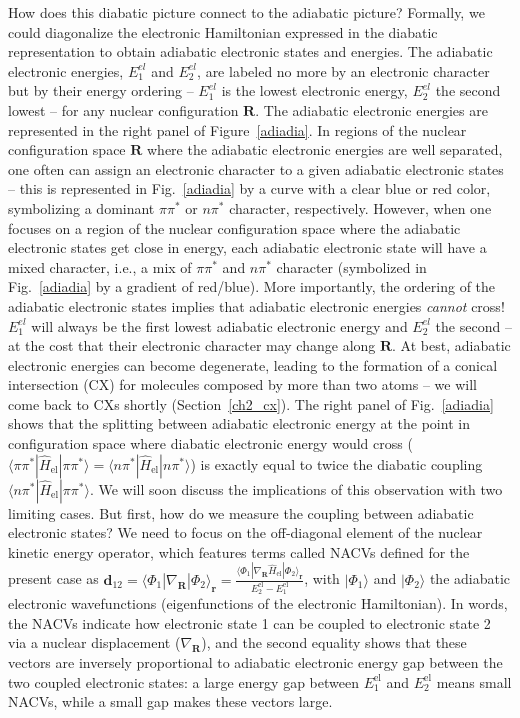 \documentclass[9pt,bestpractices,pubversion]{livecoms}
\newcommand{\bs}{\mathbf}
\begin{document}
How does this diabatic picture connect to the adiabatic picture? Formally, we could diagonalize the electronic Hamiltonian expressed in the diabatic representation to obtain adiabatic electronic states and energies. The adiabatic electronic energies, $E_1^{\textit{el}}$ and $E_2^{\textit{el}}$, are labeled no more by an electronic character but by their energy ordering --  $E_1^{\textit{el}}$ is the lowest electronic energy, $E_2^{\textit{el}}$ the second lowest -- for any nuclear configuration $\mathbf{R}$. The adiabatic electronic energies are represented in the right panel of Figure~\ref{adiadia}. In regions of the nuclear configuration space $\mathbf{R}$ where the adiabatic electronic energies are well separated, one often can assign an electronic character to a given adiabatic electronic states -- this is represented in Fig.~\ref{adiadia} by a curve with a clear blue or red color, symbolizing a dominant $\pi\pi^\ast$ or $n\pi^\ast$ character, respectively. However, when one focuses on a region of the nuclear configuration space where the adiabatic electronic states get close in energy, each adiabatic electronic state will have a mixed character, i.e., a mix of $\pi\pi^\ast$ and $n\pi^\ast$ character (symbolized in Fig.~\ref{adiadia} by a gradient of red/blue). More importantly, the ordering of the adiabatic electronic states implies that adiabatic electronic energies \textit{cannot} cross! $E_1^{\textit{el}}$ will always be the first lowest adiabatic electronic energy and $E_2^{\textit{el}}$ the second -- at the cost that their electronic character may change along $\mathbf{R}$. At best, adiabatic electronic energies can become degenerate, leading to the formation of a conical intersection (CX) for molecules composed by more than two atoms -- we will come back to CXs shortly (Section~\ref{ch2_cx}). The right panel of Fig.~\ref{adiadia} shows that the splitting between adiabatic electronic energy at the point in configuration space where diabatic electronic energy would cross ($\langle \pi\pi^\ast | \hat{H}_{\text{el}} | \pi\pi^\ast\rangle = \langle n\pi^\ast | \hat{H}_{\text{el}} | n\pi^\ast\rangle$) is exactly equal to twice the diabatic coupling $\langle n\pi^\ast | \hat{H}_{\text{el}} | \pi\pi^\ast\rangle$. We will soon discuss the implications of this observation with two limiting cases. But first, how do we measure the coupling between adiabatic electronic states? We need to focus on the off-diagonal element of the nuclear kinetic energy operator, which features terms called NACVs defined for the present case as $\mathbf{d}_{12} = \langle \Phi_1| \nabla_{\mathbf{R}}| \Phi_2 \rangle_{\bs r} = \frac{\langle \Phi_1| \nabla_{\mathbf{R}}\hat{H}_{\text{el}}| \Phi_2 \rangle_{\bs r} }{E_2^{\text{el}}-E_1^{\text{el}}}$, with $|\Phi_1\rangle$ and $|\Phi_2\rangle$ the adiabatic electronic wavefunctions (eigenfunctions of the electronic Hamiltonian). In words, the NACVs indicate how electronic state 1 can be coupled to electronic state 2 via a nuclear displacement ($\nabla_{\mathbf{R}}$), and the second equality shows that these vectors are inversely proportional to adiabatic electronic energy gap between the two coupled electronic states: a large energy gap between $E_1^{\text{el}}$ and $E_2^{\text{el}}$ means small NACVs, while a small gap makes these vectors large.
\end{document}
